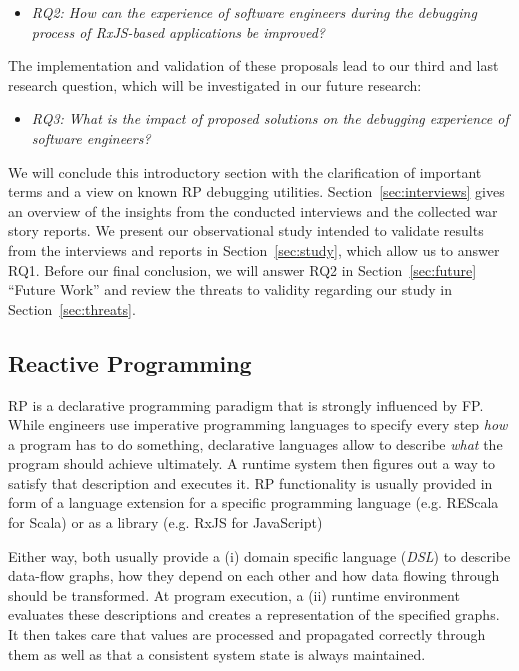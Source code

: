\documentclass[sigplan,screen]{acmart}
\begin{document}
\begin{itemize}
	\item \emph{RQ2: How can the experience of software engineers during the debugging process of RxJS-based applications be improved?}
\end{itemize}

The implementation and validation of these proposals lead to our third and last research question, which will be investigated in our future research:

\begin{itemize}
	\item \emph{RQ3: What is the impact of proposed solutions on the debugging experience of software engineers?}
\end{itemize}

We will conclude this introductory section with the clarification of important terms and a view on known RP debugging utilities. Section~\ref{sec:interviews} gives an overview of the insights from the conducted interviews and the collected war story reports. We present our observational study intended to validate results from the interviews and reports in Section~\ref{sec:study}, which allow us to answer RQ1. Before our final conclusion, we will answer RQ2 in Section~\ref{sec:future} ``Future Work'' and review the threats to validity regarding our study in Section~\ref{sec:threats}.

\subsection{Reactive Programming}

RP is a declarative programming paradigm that is strongly influenced by FP. While engineers use imperative programming languages to specify every step \emph{how} a program has to do something, declarative languages allow to describe \emph{what} the program should achieve ultimately. A runtime system then figures out a way to satisfy that description and executes it. RP functionality is usually provided in form of a language extension for a specific programming language (e.g. REScala for Scala\cite{10.1145/2577080.2577083}) or as a library (e.g. RxJS for JavaScript\cite{rxjs})

Either way, both usually provide a (i) domain specific language (\emph{DSL}) to describe data-flow graphs, how they depend on each other and how data flowing through should be transformed. At program execution, a (ii) runtime environment evaluates these descriptions and creates a representation of the specified graphs. It then takes care that values are processed and propagated correctly through them as well as that a consistent system state\cite{10.1145/2501654.2501666} is always maintained.
\end{document}
